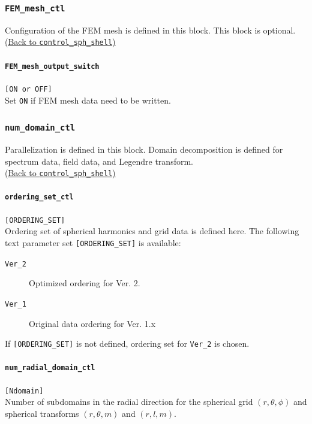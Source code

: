 \subsubsection{\tt FEM\_mesh\_ctl}
\label{href_t:FEM_mesh_ctl}
Configuration of the FEM mesh is defined in this block. This block is optional.
\hyperref[href_i:FEM_mesh_ctl]{(Back to {\tt control\_sph\_shell})}

\paragraph{\tt FEM\_mesh\_output\_switch}
\label{href_t:FEM_mesh_output_switch}
\verb|[ON or OFF]| \\
Set \verb|ON| if FEM mesh data need to be written.
%

\subsubsection{\tt num\_domain\_ctl}
\label{href_t:num_domain_ctl}
Parallelization is defined in this block. Domain decomposition is defined for spectrum data, field data, and Legendre transform. \\
\hyperref[href_i:num_domain_ctl]{(Back to {\tt control\_sph\_shell})}

\paragraph{\tt ordering\_set\_ctl}
\label{href_t:ordering_set_ctl}
\verb|[ORDERING_SET]| \\
 Ordering set of spherical harmonics and grid data is defined here.  The following text parameter set \verb|[ORDERING_SET]| is available:
 \begin{description}
 \item[{\tt Ver\_2}]  Optimized ordering for Ver. 2.
 \item[{\tt Ver\_1}] Original data ordering for Ver. 1.x
 \end{description} 

If \verb|[ORDERING_SET]| is not defined, ordering set for \verb|Ver_2| is chosen.

\paragraph{\tt num\_radial\_domain\_ctl}
\label{href_t:num_radial_domain_ctl}
\verb|[Ndomain]| \\
Number of subdomains in the radial direction for the spherical grid $(r, \theta, \phi)$ and spherical transforms $(r, \theta, m)$ and $(r, l, m)$.

